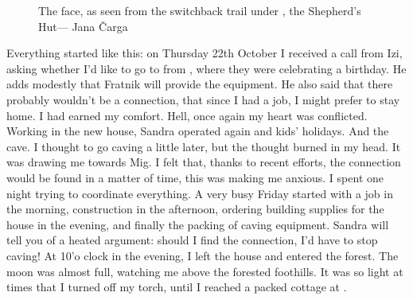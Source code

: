 \begin{figure}[t!]
\checkoddpage \ifoddpage \forcerectofloat \else \forceversofloat \fi
\centering
{}
\caption{The \protect{} face, as seen from the switchback trail under \protect{}, the Shepherd's Hut--- Jana Čarga }
\label{migovec south face}
\end{figure}

Everything started like this: on Thursday 22th October I received a call from Izi, asking whether I'd like to go to  from , where they were celebrating a birthday. He adds modestly that Fratnik will provide the equipment. He also said that there probably wouldn't be a connection, that since I had a job, I might prefer to stay home. I had earned my comfort. Hell, once again my heart was conflicted. Working in the new house, Sandra operated again and kids' holidays. And the cave. I thought to go caving a little later, but the thought burned in my head. It was drawing me towards Mig. I felt that, thanks to recent efforts, the connection would be found in a matter of time, this was making me anxious. I spent one night trying to coordinate everything. A very busy Friday started with a job in the morning,  construction in the afternoon, ordering building supplies for the house in the evening, and finally the packing of caving equipment. Sandra will tell you of a heated argument: should I find the connection, I'd have to stop caving!  At 10'o clock in the evening, I left the house and entered the forest.  The moon was almost full, watching me above the forested foothills. It was so light at times that I turned off my torch, until I reached a packed cottage at .

